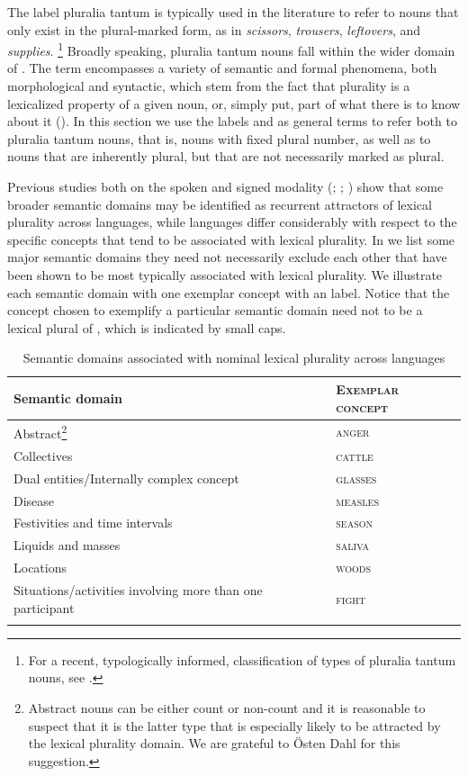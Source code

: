 \documentclass[output=collectionpaper]{langsci/langscibook}
\begin{document}
The label pluralia tantum is typically used in the literature to refer to nouns that only exist in the plural-marked form, as in  \textit{scissors}, \textit{trousers}, \textit{leftovers}, and \textit{supplies}.%
\footnote{%
For a recent, typologically informed, classification of types of pluralia tantum nouns, see \cite{Corbett2018}.
} %
Broadly speaking, pluralia tantum nouns fall within the wider domain of . The term encompasses a variety of semantic and formal phenomena, both morphological and syntactic, which stem from the fact that plurality is a lexicalized property of a given noun, or, simply put, part of what there is to know about it (\citealt[2]{Acquaviva2008}). In this section we use the labels  and  as general terms to refer both to pluralia tantum nouns, that is, nouns with fixed plural number, as well as to nouns that are inherently plural, but that are not necessarily marked as plural.

Previous studies both on the spoken and signed modality (\citealt{Koptjevskaja-Tamm2001}; \citealt{Meer2015}; \citealt{Boerstell2017}) show that some broader semantic domains may be identified as recurrent attractors of lexical plurality across languages, while languages differ considerably with respect to the specific concepts that tend to be associated with lexical plurality. In  we list some major semantic domains \textendash{} they need not necessarily exclude each other \textendash{} that have been shown to be most typically associated with lexical plurality. We illustrate each semantic domain with one exemplar concept with an  label. Notice that the concept chosen to exemplify a particular semantic domain need not to be a lexical plural of , which is indicated by small caps.

\begin{table}[h]
\caption{Semantic domains associated with nominal lexical plurality across languages\label{tab:WDG:17}}
\begin{tabularx}{\textwidth}{Q>{\scshape}l}
\lsptoprule
Semantic domain 	& \normalfont	Exemplar concept\\
\midrule
Abstract\footnote{Abstract nouns can be either count or non-count and it is reasonable to suspect that it is the latter type that is especially likely to be attracted by the lexical plurality domain. We are grateful to Östen Dahl for this suggestion.}	&	anger\\
Collectives 	&	cattle\\
Dual entities/Internally complex concept 	&	glasses \\
Disease 	&	measles\\
Festivities and time intervals 	&	season\\
Liquids and masses 	&	saliva\\
Locations 	&	woods\\
Situations/activities involving more than one participant 	&	fight\\
\lspbottomrule
\end{tabularx}
\end{table}
\end{document}
